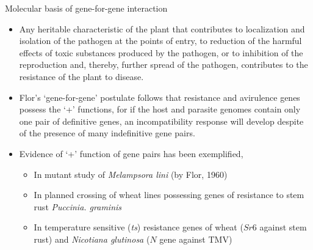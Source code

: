 \documentclass[11pt,dvipsnames,ignorenonframetext,aspectratio=169]{beamer}
\providecommand{\tightlist}{%
  \setlength{\itemsep}{0pt}\setlength{\parskip}{0pt}}
\begin{document}
\begin{frame}{Molecular basis of gene-for-gene interaction}
\protect\hypertarget{molecular-basis-of-gene-for-gene-interaction}{}
\small

\begin{itemize}
\tightlist
\item
  Any heritable characteristic of the plant that contributes to
  localization and isolation of the pathogen at the points of entry, to
  reduction of the harmful effects of toxic substances produced by the
  pathogen, or to inhibition of the reproduction and, thereby, further
  spread of the pathogen, contributes to the resistance of the plant to
  disease.
\item
  Flor's `gene-for-gene' postulate follows that resistance and
  avirulence genes possess the `+' functions, for if the host and
  parasite genomes contain only one pair of definitive genes, an
  incompatibility response will develop despite of the presence of many
  indefinitive gene pairs.
\item
  Evidence of `+' function of gene pairs has been exemplified,

  \begin{itemize}
  \footnotesize
  \item In mutant study of \textit{Melampsora lini} (by Flor, 1960) 
  \item In planned crossing of wheat lines possessing genes of resistance to stem rust \textit{Puccinia. graminis}
  \item In temperature sensitive (\textit{ts}) resistance genes of wheat ($Sr6$ against stem rust) and \textit{Nicotiana glutinosa} ($N$ gene against TMV)
  \end{itemize}
\end{itemize}
\end{frame}
\end{document}

